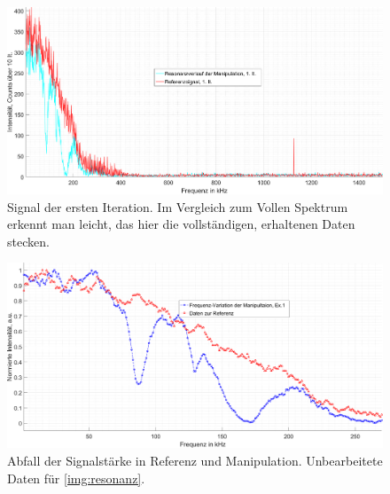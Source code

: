 \documentclass[numbers=noenddot,a4paper,notitlepage,twoside,BCOR15mm]{scrartcl}
\begin{document}
				\begin{figure}
				\includegraphics[width=\textwidth]{erste_it.png}
				\caption{Signal der ersten Iteration. Im Vergleich zum Vollen Spektrum erkennt man leicht, das hier die vollständigen, erhaltenen Daten stecken.}\label{img:1it}
				\end{figure}

				\begin{figure}
					\includegraphics[width=\textwidth]{freq_smooth.png}
					\caption{Abfall der Signalstärke in Referenz und Manipulation. Unbearbeitete Daten für \autoref{img:resonanz}.}\label{img:1itsm}
				\end{figure}
\end{document}
